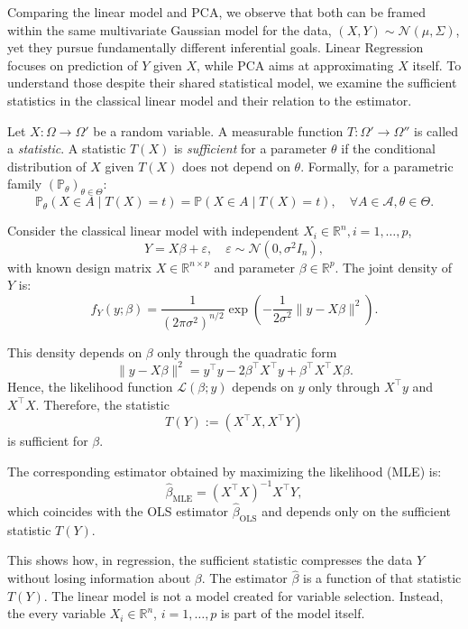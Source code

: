 Comparing the linear model and PCA, we observe that both can be framed within the same multivariate Gaussian model for the data, 
\((X,Y) \sim \mathcal{N}(\mu, \Sigma)\), yet they pursue fundamentally different inferential goals. Linear Regression focuses on prediction of \(Y\) given \(X\), while PCA aims at approximating \(X\) itself. To understand those despite their shared statistical model, we examine the sufficient statistics in the classical linear model and their relation to the estimator.

\begin{defn}
Let $X : \Omega \rightarrow \Omega'$ be a random variable. A measurable function $T: \Omega' \rightarrow \Omega''$ is called a \emph{statistic}. A statistic $T(X)$ is \emph{sufficient} for a parameter $\theta$ if the conditional distribution of $X$ given $T(X)$ does not depend on $\theta$. Formally, for a parametric family $(\mathbb{P}_\theta)_{\theta \in \Theta}$:
\[
\mathbb{P}_\theta(X \in A \mid T(X) = t) = \mathbb{P}(X \in A \mid T(X) = t), \quad \forall A \in \mathcal{A}, \theta \in \Theta.
\]
\end{defn}

\begin{ex}
Consider the classical linear model with independent $X_i \in \mathbb{R}^n, i = 1, \dots, p$,
\[
Y = X \beta + \varepsilon, \quad \varepsilon \sim \mathcal{N}(0, \sigma^2 I_n),
\]
with known design matrix $X \in \mathbb{R}^{n \times p}$ and parameter $\beta \in \mathbb{R}^p$. The joint density of $Y$ is:
\[
f_Y(y; \beta) = \frac{1}{(2\pi \sigma^2)^{n/2}} \exp\left(-\frac{1}{2\sigma^2} \| y - X\beta \|^2 \right).
\]

This density depends on $\beta$ only through the quadratic form
\[
\| y - X\beta \|^2 = y^\top y - 2\beta^\top X^\top y + \beta^\top X^\top X \beta.
\]
Hence, the likelihood function $\mathcal{L}(\beta; y)$ depends on $y$ only through $X^\top y$ and $X^\top X$. Therefore, the statistic
\[
T(Y) := (X^\top X, X^\top Y)
\]
is sufficient for $\beta$.

The corresponding estimator obtained by maximizing the likelihood (MLE) is:
\[
\hat{\beta}_{\text{MLE}} = (X^\top X)^{-1} X^\top Y,
\]
which coincides with the OLS estimator $\hat{\beta}_{\text{OLS}}$ and depends only on the sufficient statistic $T(Y)$.
\end{ex}

This shows how, in regression, the sufficient statistic compresses the data $Y$ without losing information about $\beta$. The estimator $\hat{\beta}$ is a function of that statistic $T(Y)$. The linear model is not a model created for variable selection. Instead, the every variable $X_i \in \mathbb{R}^n$, $i = 1, \dots, p$ is part of the model itself.

